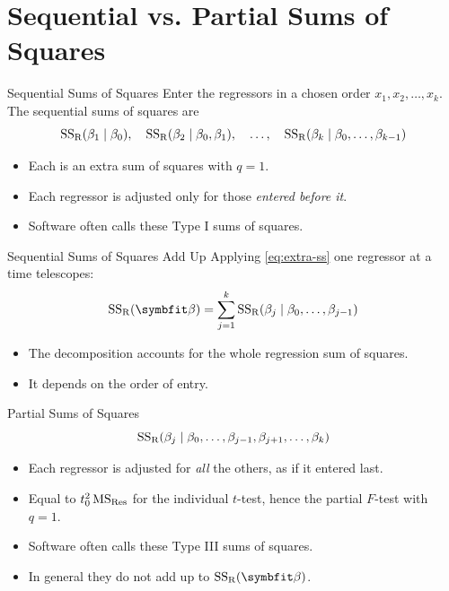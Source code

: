 \section{Sequential vs. Partial Sums of Squares}


\begin{frame}{Sequential Sums of Squares}
    Enter the regressors in a chosen order $x_1,x_2,\dots,x_k$. The sequential sums of squares are
    \[
    \mathrm{SS}_{\mathrm{R}}(\beta_1\mid\beta_0),\quad
    \mathrm{SS}_{\mathrm{R}}(\beta_2\mid\beta_0,\beta_1),\quad\dots,\quad
    \mathrm{SS}_{\mathrm{R}}(\beta_k\mid\beta_0,\dots,\beta_{k-1})
    \]
    \begin{itemize}
        \item Each is an extra sum of squares with $q=1$.
        \item Each regressor is adjusted only for those \emph{entered before it}.
        \item Software often calls these Type I sums of squares.
    \end{itemize}
\end{frame}


\begin{frame}{Sequential Sums of Squares Add Up}
    Applying \eqref{eq:extra-ss} one regressor at a time telescopes:
    \begin{align}
        \SSR(\bbeta) = \sum_{j=1}^{k}\SSR(\beta_j\mid\beta_0,\dots,\beta_{j-1})
        \label{eq:seq-sum}
    \end{align}
    \begin{itemize}
        \item The decomposition accounts for the whole regression sum of squares.
        \item It depends on the order of entry.
    \end{itemize}
\end{frame}


\begin{frame}{Partial Sums of Squares}
    \[
    \mathrm{SS}_{\mathrm{R}}(\beta_j\mid\beta_0,\dots,\beta_{j-1},\beta_{j+1},\dots,\beta_k)
    \]
    \begin{itemize}
        \item Each regressor is adjusted for \emph{all} the others, as if it entered last.
        \item Equal to $t_0^2\,\mathrm{MS}_{\mathrm{Res}}$ for the individual $t$-test, hence the partial $F$-test with $q=1$.
        \item Software often calls these Type III sums of squares.
        \item In general they do not add up to $\SSR(\bbeta)$.
    \end{itemize}
\end{frame}


